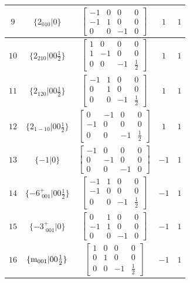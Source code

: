 \documentclass[fleqn,8pt]{jsarticle}
\begin{document}
\begin{longtable}{ccccc}
$ 9 $ & $ \{2{}_{010}|0\} $ & $ \begin{bmatrix} -1 & 0 & 0 & 0 \\ -1 & 1 & 0 & 0 \\ 0 & 0 & -1 & 0 \end{bmatrix} $ & $ 1 $ & $ 1 $ \\ \hline
$ 10 $ & $ \{2{}_{210}|0 0 \frac{1}{2}\} $ & $ \begin{bmatrix} 1 & 0 & 0 & 0 \\ 1 & -1 & 0 & 0 \\ 0 & 0 & -1 & \frac{1}{2} \end{bmatrix} $ & $ 1 $ & $ 1 $ \\ \hline
$ 11 $ & $ \{2{}_{120}|0 0 \frac{1}{2}\} $ & $ \begin{bmatrix} -1 & 1 & 0 & 0 \\ 0 & 1 & 0 & 0 \\ 0 & 0 & -1 & \frac{1}{2} \end{bmatrix} $ & $ 1 $ & $ 1 $ \\ \hline
$ 12 $ & $ \{2{}_{1-10}|0 0 \frac{1}{2}\} $ & $ \begin{bmatrix} 0 & -1 & 0 & 0 \\ -1 & 0 & 0 & 0 \\ 0 & 0 & -1 & \frac{1}{2} \end{bmatrix} $ & $ 1 $ & $ 1 $ \\ \hline
$ 13 $ & $ \{-1|0\} $ & $ \begin{bmatrix} -1 & 0 & 0 & 0 \\ 0 & -1 & 0 & 0 \\ 0 & 0 & -1 & 0 \end{bmatrix} $ & $ -1 $ & $ 1 $ \\ \hline
$ 14 $ & $ \{-6^{+}_{\,\,001}|0 0 \frac{1}{2}\} $ & $ \begin{bmatrix} -1 & 1 & 0 & 0 \\ -1 & 0 & 0 & 0 \\ 0 & 0 & -1 & \frac{1}{2} \end{bmatrix} $ & $ -1 $ & $ 1 $ \\ \hline
$ 15 $ & $ \{-3^{+}_{\,\,001}|0\} $ & $ \begin{bmatrix} 0 & 1 & 0 & 0 \\ -1 & 1 & 0 & 0 \\ 0 & 0 & -1 & 0 \end{bmatrix} $ & $ -1 $ & $ 1 $ \\ \hline
$ 16 $ & $ \{{\rm m}_{001}|0 0 \frac{1}{2}\} $ & $ \begin{bmatrix} 1 & 0 & 0 & 0 \\ 0 & 1 & 0 & 0 \\ 0 & 0 & -1 & \frac{1}{2} \end{bmatrix} $ & $ -1 $ & $ 1 $ \\ \hline

\end{longtable}
\end{document}
